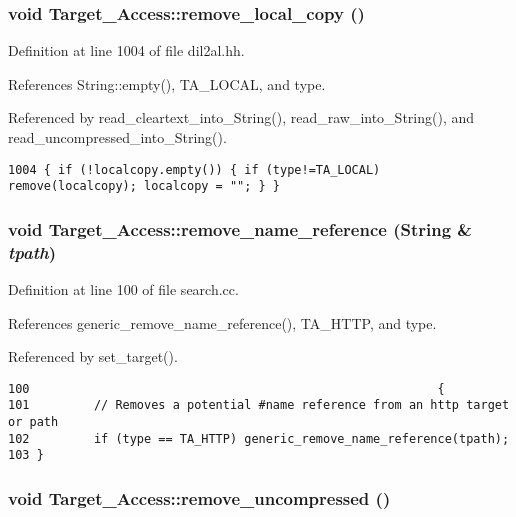 \subsubsection{\setlength{\rightskip}{0pt plus 5cm}void Target\_\-Access::remove\_\-local\_\-copy ()\hspace{0.3cm}{\tt  [inline]}}\label{classTarget__Access_a12}




Definition at line 1004 of file dil2al.hh.

References String::empty(), TA\_\-LOCAL, and type.

Referenced by read\_\-cleartext\_\-into\_\-String(), read\_\-raw\_\-into\_\-String(), and read\_\-uncompressed\_\-into\_\-String().



\footnotesize\begin{verbatim}1004 { if (!localcopy.empty()) { if (type!=TA_LOCAL) remove(localcopy); localcopy = ""; } }
\end{verbatim}\normalsize 
{}
\subsubsection{\setlength{\rightskip}{0pt plus 5cm}void Target\_\-Access::remove\_\-name\_\-reference ({\bf String} \& {\em tpath})\hspace{0.3cm}{\tt  [protected]}}\label{classTarget__Access_b1}




Definition at line 100 of file search.cc.

References generic\_\-remove\_\-name\_\-reference(), TA\_\-HTTP, and type.

Referenced by set\_\-target().



\footnotesize\begin{verbatim}100                                                         {
101         // Removes a potential #name reference from an http target or path
102         if (type == TA_HTTP) generic_remove_name_reference(tpath);
103 }
\end{verbatim}\normalsize 
{}
\subsubsection{\setlength{\rightskip}{0pt plus 5cm}void Target\_\-Access::remove\_\-uncompressed ()\hspace{0.3cm}{\tt  [inline]}}\label{classTarget__Access_a13}




